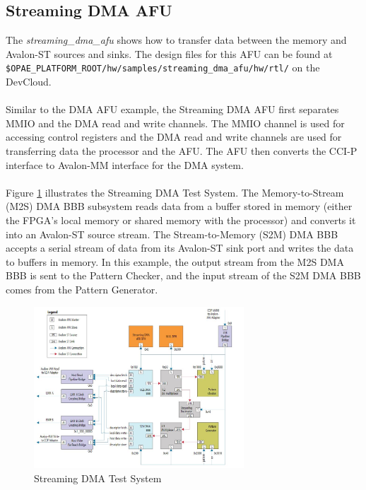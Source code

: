 \documentclass[11pt, twoside, pdftex]{article}
\begin{document}
\subsection{Streaming DMA AFU}
The {\it streaming\_dma\_afu} shows how to transfer data between the memory and Avalon-ST sources and sinks. The design files for this AFU can be found at\\ \verb|$OPAE_PLATFORM_ROOT/hw/samples/streaming_dma_afu/hw/rtl/| on the DevCloud.\\
\\
Similar to the DMA AFU example, the Streaming DMA AFU first separates MMIO and the DMA read and write channels. The MMIO channel is used for accessing control registers and the DMA read and write channels are used for transferring data the processor and the AFU. The AFU then converts the CCI-P interface to Avalon-MM interface for the DMA system.\\
\\
Figure \ref{fig:stSystem} illustrates the Streaming DMA Test System. The Memory-to-Stream (M2S) DMA BBB subsystem reads data from a buffer stored in memory (either the FPGA's local memory or shared memory with the processor) and converts it into an Avalon-ST source stream. The Stream-to-Memory (S2M) DMA BBB accepts a serial stream of data from its Avalon-ST sink port and writes the data to buffers in memory. In this example, the output stream from the M2S DMA BBB is sent to the Pattern Checker, and the input stream of the S2M DMA BBB comes from the Pattern Generator.\\

\begin{figure}[H]
    \centering
    \includegraphics[width=0.70\textwidth]{figures/STSystem.JPG}
    \caption{Streaming DMA Test System}
    \label{fig:stSystem}
\end{figure}
\end{document}
